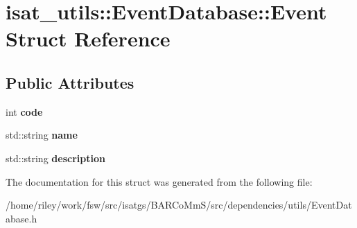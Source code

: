 \hypertarget{structisat__utils_1_1_event_database_1_1_event}{}\section{isat\+\_\+utils\+:\+:Event\+Database\+:\+:Event Struct Reference}
\label{structisat__utils_1_1_event_database_1_1_event}
\subsection*{Public Attributes}
\begin{DoxyCompactItemize}
\item 
int {\bfseries code}\hypertarget{structisat__utils_1_1_event_database_1_1_event_ae018f33c3d5318a8ad432e1c5830d1fe}{}\label{structisat__utils_1_1_event_database_1_1_event_ae018f33c3d5318a8ad432e1c5830d1fe}

\item 
std\+::string {\bfseries name}\hypertarget{structisat__utils_1_1_event_database_1_1_event_aaeb1f114bb2d481c847d8631835b99cd}{}\label{structisat__utils_1_1_event_database_1_1_event_aaeb1f114bb2d481c847d8631835b99cd}

\item 
std\+::string {\bfseries description}\hypertarget{structisat__utils_1_1_event_database_1_1_event_a7fe157bfa4c9deddcbb3096ca35d6089}{}\label{structisat__utils_1_1_event_database_1_1_event_a7fe157bfa4c9deddcbb3096ca35d6089}

\end{DoxyCompactItemize}


The documentation for this struct was generated from the following file\+:\begin{DoxyCompactItemize}
\item 
/home/riley/work/fsw/src/isatgs/\+B\+A\+R\+Co\+Mm\+S/src/dependencies/utils/Event\+Database.\+h\end{DoxyCompactItemize}
